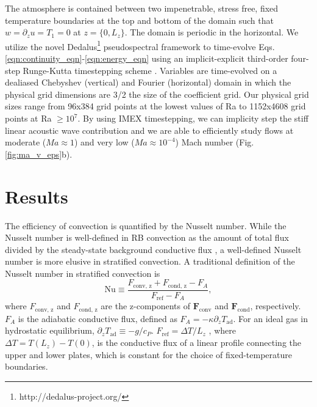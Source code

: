 \documentclass[aps, prl, twocolumn, nofootinbib, groupedaddress, amsfonts, amssymb, amsmath]{revtex4-1}
\begin{document}
The atmosphere is contained between two impenetrable, stress free, fixed temperature boundaries at
the top and bottom of the domain such that $w = \partial_z u = T_1 = 0$ at $z = \{0, L_z\}$. The domain
is periodic in the horizontal. We utilize the novel Dedalus\footnote{http://dedalus-project.org/} pseudospectral framework 
 to time-evolve Eqs. 
\ref{eqn:continuity_eqn}-\ref{eqn:energy_eqn} using an implicit-explicit third-order four-step 
Runge-Kutta timestepping scheme \cite{ascher&all1997}.  
Variables are time-evolved on a dealiased Chebyshev (vertical)
and Fourier (horizontal) domain in which the
physical grid dimensions are 3/2 the size of the coefficient grid.  Our physical grid sizes range from
96x384 grid points at the lowest values of Ra to 1152x4608 grid points at Ra $\geq 10^{7}$. 
By using IMEX timestepping, we can implicity step the stiff linear acoustic wave contribution and we are able to
efficiently study flows at moderate ($Ma \approx 1$) and very low ($Ma \approx 10^{-4}$)
Mach number (Fig. \ref{fig:ma_v_eps}b).

\section{Results}
\label{sec:results}

The efficiency of convection is quantified by the Nusselt number.  
While the Nusselt number is well-defined in RB convection
as the amount of total flux divided by the steady-state background conductive flux 
\cite{johnston&doering2009, otero&all2002},
a well-defined Nusselt number is more elusive in stratified convection.  A traditional definition of the Nusselt
number in stratified convection is \cite{graham1975,hurlburt&all1984}
\begin{equation}
\text{Nu} \equiv \frac{F_{\text{conv, z}} + F_{\text{cond, z}} - F_A}{F_{\text{ref}} - F_A},
\label{eqn:nusselt}
\end{equation}
where $F_{\text{conv, z}}$ and $F_{\text{cond, z}}$ are the z-components of $\bm{F}_{\text{conv}}$ and $\bm{F}_{\text{cond}}$,
respectively.  $F_A$ is the adiabatic conductive flux, defined as $F_A = -\kappa \partial_z T_{\text{ad}}$.  For an
ideal gas in hydrostatic equilibrium, $\partial_z T_{\text{ad}} \equiv - g / c_{P}$.
$F_{\text{ref}} = \Delta T / L_z$ , where $\Delta T = T(L_z) - T(0)$, is the conductive flux of a linear profile connecting the upper
and lower plates, which is constant for the choice of fixed-temperature boundaries.
\end{document}
